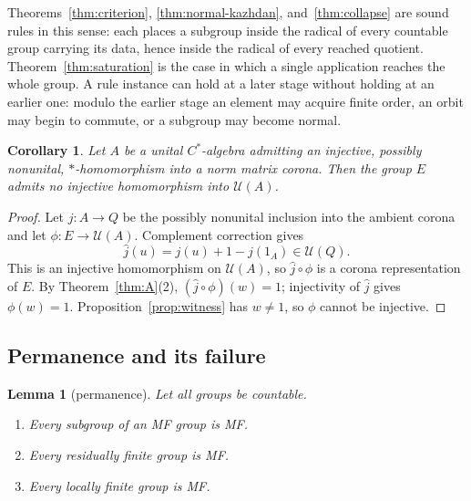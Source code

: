\documentclass[11pt]{amsart}
\newcommand{\leanverified}[2]{\ignorespaces}
\newtheorem{lemma}[theorem]{Lemma}
\newtheorem{corollary}[theorem]{Corollary}
\theoremstyle{definition}
\theoremstyle{remark}
\theoremstyle{plain}
\newcommand{\U}{\mathcal U}
\begin{document}
Theorems~\ref{thm:criterion}, \ref{thm:normal-kazhdan},
and~\ref{thm:collapse} are sound rules in this sense: each places a
subgroup inside the radical of every countable group carrying its data,
hence inside the radical of every reached quotient.
Theorem~\ref{thm:saturation} is the case in which a single application
reaches the whole group.  A rule instance can hold at a later stage
without holding at an earlier one: modulo the earlier stage an element
may acquire finite order, an orbit may begin to commute, or a subgroup
may become normal.

\begin{corollary}\label{cor:nofaithful}
Let $A$ be a unital $C^*$-algebra admitting an injective, possibly
nonunital, $*$-homomorphism into a norm matrix corona.  Then the group $E$
admits no injective homomorphism into $\U(A)$.
\leanverified{Sofic/LiteralNonMFConsequences}{GroupApproximation.LiteralNonMFConsequences.literal_no_faithful_corona_subalgebra_target}
\end{corollary}

\begin{proof}
Let $j\colon A\to Q$ be the possibly nonunital inclusion into the ambient
corona and let $\phi\colon E\to\U(A)$.  Complement correction gives
\[
   \widehat j(u)=j(u)+1-j(1_A)\in\U(Q).
\]
This is an injective homomorphism on \(\U(A)\), so
\(\widehat j\circ\phi\) is a corona representation of \(E\).
By Theorem~\ref{thm:A}(2), \((\widehat j\circ\phi)(w)=1\); injectivity
of \(\widehat j\) gives \(\phi(w)=1\).  Proposition~\ref{prop:witness} has
\(w\neq1\), so \(\phi\) cannot be injective.
\end{proof}

\subsection{Permanence and its failure}

\begin{lemma}[permanence]\label{lem:permanence}
Let all groups be countable.
\begin{enumerate}
\item Every subgroup of an MF group is MF.
\item Every residually finite group is MF.
\item Every locally finite group is MF.
\leanverified{Sofic/OperatorMFPositiveControls}{GroupApproximation.IsOperatorMF.subgroup}
\leanverified{Sofic/OperatorMFPositiveControls}{GroupApproximation.isOperatorMF_of_residuallyFinite}
\leanverified{Sofic/LocallyFiniteMF}{GroupApproximation.isOperatorMF_of_locallyFinite}
\end{enumerate}
\end{lemma}
\end{document}
